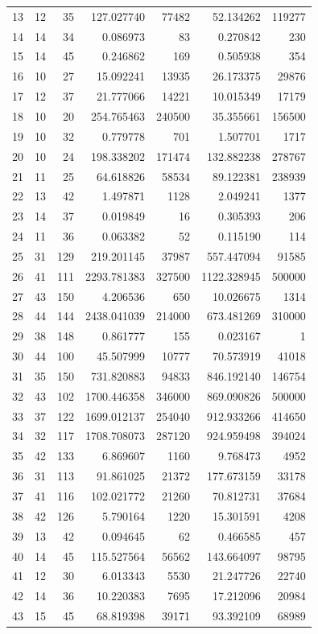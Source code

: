 \documentclass{article}
\begin{document}
\begin{landscape}
\begin{longtable}{rrrrrrr}
13 & 12 & 35 & 127.027740 & 77482 & 52.134262 & 119277 \\
14 & 14 & 34 & 0.086973 & 83 & 0.270842 & 230 \\
15 & 14 & 45 & 0.246862 & 169 & 0.505938 & 354 \\
16 & 10 & 27 & 15.092241 & 13935 & 26.173375 & 29876 \\
17 & 12 & 37 & 21.777066 & 14221 & 10.015349 & 17179 \\
18 & 10 & 20 & 254.765463 & 240500 & 35.355661 & 156500 \\
19 & 10 & 32 & 0.779778 & 701 & 1.507701 & 1717 \\
20 & 10 & 24 & 198.338202 & 171474 & 132.882238 & 278767 \\
21 & 11 & 25 & 64.618826 & 58534 & 89.122381 & 238939 \\
22 & 13 & 42 & 1.497871 & 1128 & 2.049241 & 1377 \\
23 & 14 & 37 & 0.019849 & 16 & 0.305393 & 206 \\
24 & 11 & 36 & 0.063382 & 52 & 0.115190 & 114 \\
25 & 31 & 129 & 219.201145 & 37987 & 557.447094 & 91585 \\
26 & 41 & 111 & 2293.781383 & 327500 & 1122.328945 & 500000 \\
27 & 43 & 150 & 4.206536 & 650 & 10.026675 & 1314 \\
28 & 44 & 144 & 2438.041039 & 214000 & 673.481269 & 310000 \\
29 & 38 & 148 & 0.861777 & 155 & 0.023167 & 1 \\
30 & 44 & 100 & 45.507999 & 10777 & 70.573919 & 41018 \\
31 & 35 & 150 & 731.820883 & 94833 & 846.192140 & 146754 \\
32 & 43 & 102 & 1700.446358 & 346000 & 869.090826 & 500000 \\
33 & 37 & 122 & 1699.012137 & 254040 & 912.933266 & 414650 \\
34 & 32 & 117 & 1708.708073 & 287120 & 924.959498 & 394024 \\
35 & 42 & 133 & 6.869607 & 1160 & 9.768473 & 4952 \\
36 & 31 & 113 & 91.861025 & 21372 & 177.673159 & 33178 \\
37 & 41 & 116 & 102.021772 & 21260 & 70.812731 & 37684 \\
38 & 42 & 126 & 5.790164 & 1220 & 15.301591 & 4208 \\
39 & 13 & 42 & 0.094645 & 62 & 0.466585 & 457 \\
40 & 14 & 45 & 115.527564 & 56562 & 143.664097 & 98795 \\
41 & 12 & 30 & 6.013343 & 5530 & 21.247726 & 22740 \\
42 & 14 & 36 & 10.220383 & 7695 & 17.212096 & 20984 \\
43 & 15 & 45 & 68.819398 & 39171 & 93.392109 & 68989 \\
\end{longtable}


\end{landscape}
\end{document}
